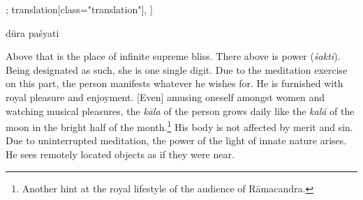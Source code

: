 \begin{alignment}[
  texts=edition[class="edition"];
  translation[class="translation"],
  ]
\begin{edition}
\begin{prose}
dūra
paśyati\dd{}
    \end{prose}
  \end{edition}
  \begin{translation}
    \begin{tlate}
      \noindent
      Above that is the place of infinite supreme bliss. There above is power (\textit{śakti}).\textsuperscript{\coro{[\lowroman{15}]}} Being designated as such, she is one single digit. Due to the meditation exercise on this part, the person manifests whatever he wishes for. He is furnished with royal pleasure and enjoyment. [Even] amusing oneself amongst women and watching musical pleasures, the \textit{kāla} of the person grows daily like the \textit{kalā} of the moon in the bright half of the month.\footnote{Another hint at the royal lifestyle of the audience of Rāmacandra.} His body is not affected by merit and sin.\textsuperscript{\coro{[\lowroman{20}]}} Due to uninterrupted meditation, the power of the light of innate nature arises. He sees remotely located objects as if they were near.
      \end{tlate}
  \end{translation}
\end{alignment}
  \ekdpb*{}
